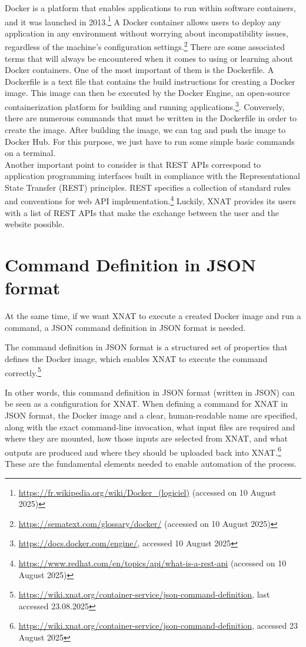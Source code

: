 Docker is a platform that enables applications to run within software containers, and it was launched in 2013.\footnote{\url{https://fr.wikipedia.org/wiki/Docker\_(logiciel)} (accessed on 10 August 2025)} A Docker container allows users to deploy any application in any environment without worrying about incompatibility issues, regardless of the machine’s configuration settings.\footnote{\url{https://sematext.com/glossary/docker/} (accessed on 10 August 2025)} There are some associated terms that will always be encountered when it comes to using or learning about Docker containers.
One of the most important of them is the Dockerfile. A Dockerfile is a text file that contains the build instructions for creating a Docker image. This image can then be executed by the Docker Engine, an open-source containerization platform for building and running applications.\footnote{\url{https://docs.docker.com/engine/}, accessed 10 August 2025}. Conversely, there are numerous commands that must be written in the Dockerfile in order to create the image. After building the image, we can tag and push the image to Docker Hub. For this purpose, we just have to run some simple basic commands on a terminal.
\\
Another important point to consider is that REST APIs correspond to application programming interfaces built in compliance with the Representational State Transfer (REST) principles.
REST specifies a collection of standard rules and conventions for web API implementation.\footnote{\url{https://www.redhat.com/en/topics/api/what-is-a-rest-api} (accessed on 10 August 2025)} Luckily, XNAT provides its users with a list of REST APIs that make the exchange between the user and the website possible. 

\section{Command Definition in JSON format}
At the same time, if we want XNAT to execute a created Docker image and run a command, a \ac{JSON} command definition in JSON format is needed. 

The command definition in JSON format is a structured set of properties that defines the Docker image, which enables XNAT to execute the command correctly.\footnote{\url{https://wiki.xnat.org/container-service/json-command-definition}, last accessed 23.08.2025}

In other words, this command definition in JSON format (written in JSON) can be seen as a configuration for XNAT. When defining a command for XNAT in JSON format, the Docker image and a clear, human-readable name are specified, along with the exact command-line invocation, what input files are required and where they are mounted, how those inputs are selected from XNAT, and what outputs are produced and where they should be uploaded back into XNAT.\footnote{\url{https://wiki.xnat.org/container-service/json-command-definition}, accessed 23 August 2025}
These are the fundamental elements needed to enable automation of the process.


